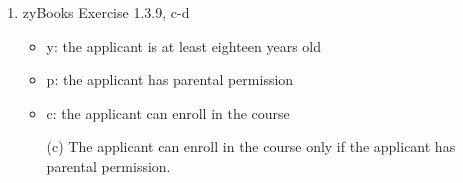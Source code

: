 \documentclass[12pt]{extreport}
\newcommand{\answer}[0]{\medskip \textbf{Answer:} \medskip}
\begin{document}
\begin{enumerate}
        \begin{enumerate}
            
            \item[(b)] A person can park in the school parking lot if they are a senior or at least seventeen years of age.
            
                \answer
                
                This sentence can be reworded as ``If you are a senior or at least seventeen years old, you can park in the school parking lot''. So \( (s \lor y) \implies p \)

            \item[(c)] Being 17 years of age is a necessary condition for being able to park in the school parking lot.
            
                \answer

                \( p \implies y \)


            \item[(d)] A person can park in the school parking lot if and only if the person is a senior and at least 17 years of age.
            
                \answer

                \( p \iff (s \land y) \)

            \item[(e)] Being able to park in the school parking lot implies that the person is either a senior or at least 17 years old.
            
                \answer

                \( p \implies (s \lor y) \)

        \end{enumerate}

    \item zyBooks Exercise 1.3.9, c-d
    
        \begin{itemize}
            \item y: the applicant is at least eighteen years old
            \item p: the applicant has parental permission
            \item c: the applicant can enroll in the course
        \end{itemize}
    
        \begin{enumerate}
            
            \item[(c)] The applicant can enroll in the course only if the applicant has parental permission.
            

\end{enumerate}
\end{enumerate}
\end{document}
